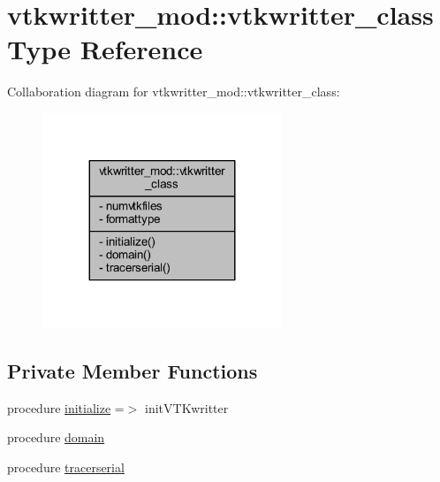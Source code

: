 \hypertarget{structvtkwritter__mod_1_1vtkwritter__class}{}\section{vtkwritter\+\_\+mod\+:\+:vtkwritter\+\_\+class Type Reference}
\label{structvtkwritter__mod_1_1vtkwritter__class}


Collaboration diagram for vtkwritter\+\_\+mod\+:\+:vtkwritter\+\_\+class\+:
\nopagebreak
\begin{figure}[H]
\begin{center}
\leavevmode
\includegraphics[width=203pt]{structvtkwritter__mod_1_1vtkwritter__class__coll__graph}
\end{center}
\end{figure}
\subsection*{Private Member Functions}
\begin{DoxyCompactItemize}
\item 
procedure \mbox{\hyperlink{structvtkwritter__mod_1_1vtkwritter__class_ad74a863969884dacf4c8d9b96088c6a6}{initialize}} =$>$ init\+V\+T\+Kwritter
\item 
procedure \mbox{\hyperlink{structvtkwritter__mod_1_1vtkwritter__class_a7abd7831d763c178e15bd8b6fb7e358e}{domain}}
\item 
procedure \mbox{\hyperlink{structvtkwritter__mod_1_1vtkwritter__class_ad87da7194456a9b70f60f53f19a5c47b}{tracerserial}}
\end{DoxyCompactItemize}
